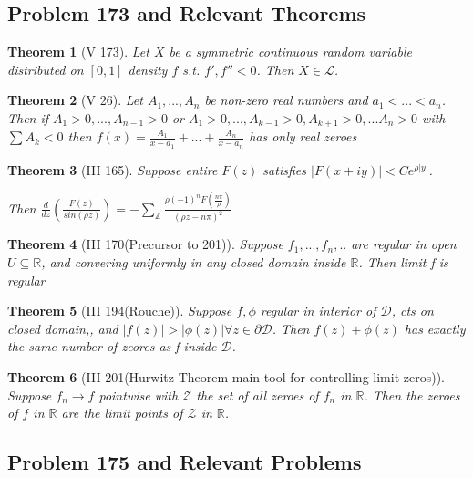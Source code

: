 \documentclass[10pt]{article}
\newcommand{\1}{\textbf{1}}
\newcommand{\R}{\mathbb{R}}
\newcommand{\Z}{\mathbb{Z}}
\newcommand{\lL}{\mathcal{L}}
\newtheorem{theorem}{Theorem}
\theoremstyle{remark}
\theoremstyle{definition}
\begin{document}
\subsection{Problem 173 and Relevant Theorems}


\begin{theorem}[V 173] \label{173}
	Let $X$ be a symmetric continuous random variable distributed on $[0,1]$ density $f$ s.t. $f',f'' < 0$. Then $X \in \lL$.
\end{theorem}

\begin{theorem}[V 26] \label{26}
	Let $A_1,...,A_n$ be non-zero real numbers and $a_1 < ... < a_n$. Then if $A_1 >0, ..., A_{n-1}>0$ or $A_1 > 0,..., A_{k-1} > 0, A_{k+1}>0,... A_n > 0$ with $\sum A_k < 0$ then $f(x) =\frac{A_1}{x-a_1} + ... + \frac{A_n}{x-a_n}$ has only real zeroes
\end{theorem}

\begin{theorem}[III 165]
	Suppose entire $F(z)$ satisfies $|F(x+iy)| < Ce^{\rho |y|}$. 

	Then $\frac{d}{dz}(\frac{F(z)}{sin(\rho z)}) = -\sum_{\Z} \frac{\rho (-1)^n F(\frac{n \pi }{\rho})}{(\rho z - n \pi)^2}$
\end{theorem}

\begin{theorem}[III 170(Precursor to 201)]
	Suppose $f_1, ..., f_n,..$ are regular in open $U \subseteq \mathbb{R}$, and convering uniformly in any closed domain inside $\R$. Then limit f is regular
\end{theorem}

\begin{theorem}[III 194(Rouche)]
	Suppose $f,\phi$ regular in interior of $\mathcal{D}$, cts on closed domain,, and $|f(z)| > |\phi(z)| \forall z \in \partial \mathcal{D}$. Then $f(z)+\phi(z)$ has exactly the same number of zeores as f inside $\mathcal{D}$.
\end{theorem}

\begin{theorem}[III 201(Hurwitz Theorem main tool for controlling limit zeros)]
	Suppose $f_n \to f$ pointwise with $\mathcal{Z}$ the set of all zeroes of $f_n$ in $\R$. Then the zeroes of $f$ in $\R$ are the limit points of $\mathcal{Z}$ in $\R$.
\end{theorem}

\subsection{Problem 175 and Relevant Problems}
\end{document}
